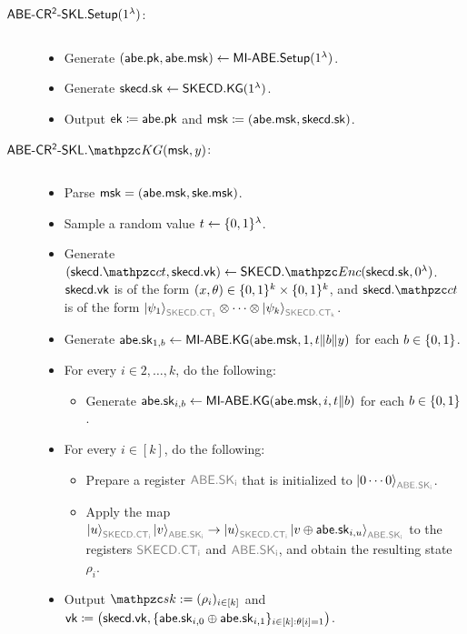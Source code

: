 \begin{description}
\item[$\mathsf{ABE}\textrm{-}\mathsf{CR^2}\textrm{-}\mathsf{SKL}.\mathsf{Setup}(1^\lambda)$:] $ $
\begin{itemize}
    \item Generate $(\mathsf{abe}.\mathsf{pk}, \mathsf{abe}.\mathsf{msk})\leftarrow\mathsf{MI}\textrm{-}\mathsf{ABE}.\mathsf{Setup}(1^\lambda)$.
        \item Generate $\mathsf{skecd}.\mathsf{sk}\leftarrow\mathsf{SKECD}.\mathsf{KG}(1^\lambda)$.
    \item Output $\mathsf{ek}\coloneqq\mathsf{abe}.\mathsf{pk}$ and
        $\mathsf{msk}\coloneqq(\mathsf{abe}.\mathsf{msk},\mathsf{skecd}.\mathsf{sk})$.
\end{itemize}



\item[$\ABECRCRSKL.\qKG(\msk, y)$:] $ $
\begin{itemize}
\item Parse $\mathsf{msk}=(\mathsf{abe}.\mathsf{msk},\mathsf{ske}.\mathsf{msk})$.
\item Sample a random value $t\leftarrow\{0,1\}^\lambda$.
\item Generate
$(\skecd.\qct,\skecd.\vk)\gets\SKECD.\qEnc(\skecd.\sk,0^\secp)$.
$\mathsf{skecd}.\mathsf{vk}$ is of the form
$(x,\theta)\in\{0,1\}^{k}\times\{0,1\}^{k}$, and $\skecd.\qct$ is of
the form
$\ket{\psi_1}_{\qreg{SKECD.CT_1}}\tensor\cdots\tensor\ket{\psi_{k}}_{\qreg{SKECD.CT_{k}}}$.

\item Generate $\mathsf{abe}.\mathsf{sk}_{1,b}\leftarrow\mathsf{MI}\textrm{-}\mathsf{ABE}.\mathsf{KG}(\mathsf{abe}.\mathsf{msk}, 1, t\|b\|y)$
  for each $b \in \{0,1\}$.

\item For every $i \in 2, \ldots, k$, do the following:
\begin{itemize}
\item Generate $\mathsf{abe}.\mathsf{sk}_{i,b}\leftarrow\mathsf{MI}\textrm{-}\mathsf{ABE}.\mathsf{KG}(\mathsf{abe}.\mathsf{msk}, i, t\|b)$
for each $b\in\{0,1\}$.
\end{itemize}

\item For every $i \in [k]$, do the following:
\begin{itemize}
\item Prepare a register $\qreg{ABE.SK_i}$ that is initialized
to $\ket{0\cdots0}_{\qreg{ABE.SK_i}}$.

\item Apply the map
$\ket{u}_{\qreg{SKECD.CT_i}}\ket{v}_{\qreg{ABE.SK_i}}\ra\ket{u}_{\qreg{SKECD.CT_i}}\ket{v\oplus\abe.\sk_{i,u}}_{\qreg{ABE.SK_i}}$
to the registers $\qreg{SKECD.CT_i}$ and $\qreg{ABE.SK_i}$, and
obtain the resulting state $\rho_i$. 
\end{itemize}

\item Output $\qsk:=(\rho_i)_{i \in [k]}$ and
$\mathsf{vk}\coloneqq\big(\mathsf{skecd}.\mathsf{vk},
\{\mathsf{abe}.\mathsf{sk}_{i,0} \oplus
\mathsf{abe}.\mathsf{sk}_{i,1}\}_{i\in[k]:\theta[i]=1}\big)$.


\end{itemize}
\end{description}
